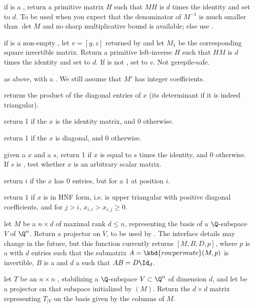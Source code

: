  if  is a ,
return a primitive matrix $H$ such that $M H$ is $d$ times the identity
and set  to $d$. To be used when you expect that the denominator
of $M^{-1}$ is much smaller than $\det M$ and no sharp multiplicative
bound is available; else use .

 if  is a non-empty
, let $v = [y,z]$ returned by  and
let $M_1$ be the corresponding square invertible matrix.
Return a primitive left-inverse $H$ such that $H M$ is
$d$ times the identity and set  to $d$. If  is not
, set  to $v$. Not gerepile-safe.

 as above, with  a . We
still assume that $M'$ has integer coefficients.

 returns the product of the diagonal
entries of $x$ (its determinant if it is indeed triangular).

 return 1 if the  $x$ is the
identity matrix, and 0 otherwise.

 return 1 if the  $x$ is diagonal,
and 0 otherwise.

 given a  $x$ and a
 $s$, return 1 if $x$ is equal to $s$ times the identity, and 0
otherwise. If $s$ is , test whether $x$ is an arbitrary scalar
matrix.

 return $i$ if the  $x$ has $0$ entries,
but for a $1$ at position $i$.

 return $1$ if $x$ is in HNF form, i.e. is upper
triangular with positive diagonal coefficients, and  for $j>i$,
$x_{i,i}>x_{i,j} \ge 0$.

 let $M$ be a  $n\times d$  of
maximal rank $d \leq n$, representing the basis of a $\Q$-subspace
$V$ of $\Q^n$. Return a projector on $V$, to be used by .
The interface details may change in the future, but this function currently
returns $[M, B,D,p]$, where $p$ is a  with $d$ entries
such that the submatrix $A = \kbd{rowpermute}(M,p)$ is invertible, $B$ is a
 and $d$ a  such that $A B = D \Id_d$.

 let $T$ be an $n\times n$
, stabilizing a $\Q$-subspace $V\subset \Q^n$ of dimension $d$, and
let  be a projector on that subspace initialized by
$(M)$. Return the $d\times d$ matrix representing $T_{|V}$
on the basis given by the columns of $M$.

